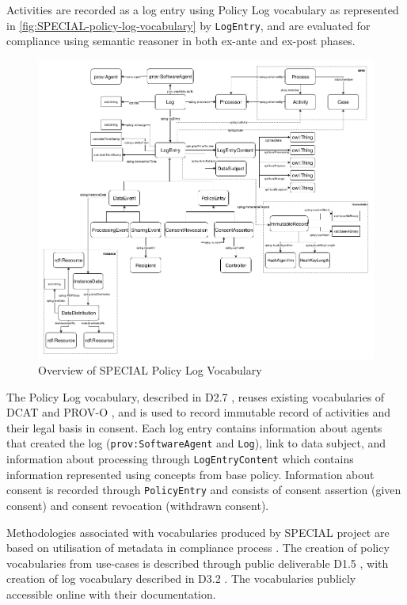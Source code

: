 Activities are recorded as a log entry using Policy Log vocabulary \cite{bonatti_special_2018-1} as represented in \autoref{fig:SPECIAL-policy-log-vocabulary} by \texttt{LogEntry}, and are evaluated for compliance using semantic reasoner in both ex-ante and ex-post phases. 
\begin{figure}[htbp]
    \centering
    \includegraphics[width=0.8\linewidth]{img/SPECIAL_logvocabulary.png}
    \caption{Overview of SPECIAL Policy Log Vocabulary \cite{bonatti_special_2018-1}}
    \label{fig:SPECIAL-policy-log-vocabulary}
\end{figure}

The Policy Log vocabulary, described in D2.7 \cite{kirrane_d2.7_2018}, reuses existing vocabularies of DCAT and PROV-O \cite{lebo_prov-o_2013}, and is used to record immutable record of activities and their legal basis in consent. Each log entry contains information about agents that created the log (\texttt{prov:SoftwareAgent} and \texttt{Log}), link to data subject, and information about processing through \texttt{LogEntryContent} which contains information represented using concepts from base policy.
Information about consent is recorded through \texttt{PolicyEntry} and consists of consent assertion (given consent) and consent revocation (withdrawn consent).

Methodologies associated with vocabularies produced by SPECIAL project are based on utilisation of metadata in compliance process \cite{wenning_compliance_2018}. The creation of policy vocabularies from use-cases is described through public deliverable D1.5 \cite{bonatti_d1.5_2018}, with creation of log vocabulary described in D3.2 \cite{kirrane_d2.7_2018}. The vocabularies publicly accessible online with their documentation.

